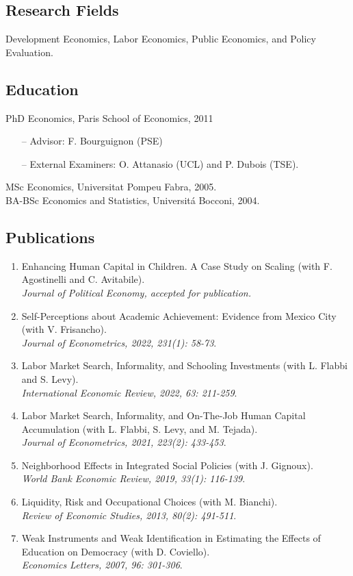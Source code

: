 \documentclass[12pt,english]{article}
\newcommand\reverselabel[1]{%
  \def\theenumi{}%
  \renewcommand\makelabel{\makebox[\dimexpr\labelwidth-3pt\relax][r]{%
    \the\numexpr#1-\value{enumi}+1\relax}}}%
\begin{document}
\subsection*{Research Fields}
Development Economics, Labor Economics, Public Economics, and Policy Evaluation.

\subsection*{Education}
PhD Economics, Paris School of Economics, 2011\vspace{-0.2cm} 
\begin{itemize}
\item [--] Advisor: F. Bourguignon (PSE) \vspace{-0.3cm} 
\item [--] External Examiners: O. Attanasio (UCL) and P. Dubois (TSE). \\
\end{itemize} \vspace{-0.5cm} 
MSc Economics, Universitat Pompeu Fabra, 2005.  \vspace{0.2cm} \\
BA-BSc Economics and Statistics, Universit\'{a} Bocconi, 2004.




\subsection*{Publications}
\begin{enumerate}
\reverselabel{7}
\item Enhancing Human Capital in Children. A Case Study on Scaling (with F. Agostinelli and C. Avitabile).\\ \textit{Journal of Political Economy, accepted for publication.}
\item Self-Perceptions about Academic Achievement: Evidence from Mexico City (with V. Frisancho). \\
\textit{Journal of Econometrics, 2022, 231(1): 58-73}.  
\item  Labor Market Search, Informality, and Schooling Investments (with L. Flabbi and S. Levy). \\ \textit{International Economic Review, 2022, 63: 211-259}.  
\item  Labor Market Search, Informality, and On-The-Job Human Capital Accumulation (with L. Flabbi, S. Levy, and M. Tejada). \\ \textit{Journal of Econometrics, 2021, 223(2): 433-453}. 
\item Neighborhood Effects in Integrated Social Policies (with J. Gignoux). \\ \textit{World Bank Economic Review, 2019, 33(1): 116-139}.
\item Liquidity, Risk and Occupational Choices (with M. Bianchi). \\ \textit{Review of Economic Studies, 2013, 80(2): 491-511}.
\item Weak Instruments and Weak Identification in Estimating the Effects of Education on Democracy (with D. Coviello).\\ \textit{Economics Letters, 2007, 96: 301-306}.
\end{enumerate}
\end{document}
